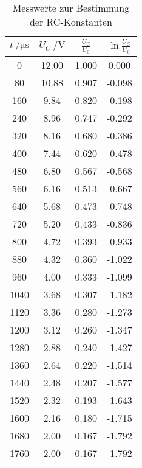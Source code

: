 \begin{table}[H]
  \centering
  \caption{Messwerte zur Bestimmung der RC-Konstanten}
  \label{tab:tabe1}
    \begin{tabular}{c c c c}
    \toprule
    $ t \: / \si{\micro\second} $ & $ U_C \: / \si {\volt} $ & $\frac{U_C}{U_0} $
    & $ \ln{\frac{U_C}{U_0}} $ \\
    \midrule
    0 & 12.00 & 1.000 & 0.000 \\
    80 & 10.88 & 0.907 & -0.098 \\
    160 & 9.84 & 0.820 & -0.198 \\
    240 & 8.96 & 0.747 & -0.292 \\
    320 & 8.16 & 0.680 & -0.386 \\
    400 & 7.44 & 0.620 & -0.478 \\
    480 & 6.80 & 0.567 & -0.568 \\
    560 & 6.16 & 0.513 & -0.667 \\
    640 & 5.68 & 0.473 & -0.748 \\
    720 & 5.20 & 0.433 & -0.836 \\
    800 & 4.72 & 0.393 & -0.933 \\
    880 & 4.32 & 0.360 & -1.022 \\
    960 & 4.00 & 0.333 & -1.099 \\
    1040 & 3.68 & 0.307 & -1.182 \\
    1120 & 3.36 & 0.280 & -1.273 \\
    1200 & 3.12 & 0.260 & -1.347 \\
    1280 & 2.88 & 0.240 & -1.427 \\
    1360 & 2.64 & 0.220 & -1.514 \\
    1440 & 2.48 & 0.207 & -1.577 \\
    1520 & 2.32 & 0.193 & -1.643 \\
    1600 & 2.16 & 0.180 & -1.715 \\
    1680 & 2.00 & 0.167 & -1.792 \\
    1760 & 2.00 & 0.167 & -1.792 \\

      \bottomrule
    \end{tabular}
\end{table}
